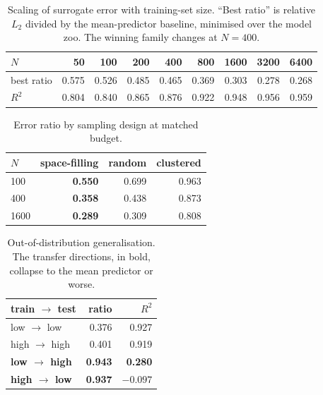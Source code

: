 \begin{table}[htbp]
\caption{Scaling of surrogate error with training-set size. ``Best ratio'' is
relative $L_2$ divided by the mean-predictor baseline, minimised over the model
zoo. The winning family changes at $N = 400$.}
\label{tab:scale}
\small
\begin{indented}\item[]
\begin{tabular}{@{}lrrrrrrrr@{}}
\toprule
$N$ & 50 & 100 & 200 & 400 & 800 & 1600 & 3200 & 6400 \\
\midrule
best ratio & 0.575 & 0.526 & 0.485 & 0.465 & 0.369 & 0.303 & 0.278 & 0.268 \\
$R^2$      & 0.804 & 0.840 & 0.865 & 0.876 & 0.922 & 0.948 & 0.956 & 0.959 \\
\bottomrule
\end{tabular}
\end{indented}
\end{table}

\begin{table}[htbp]
\caption{Error ratio by sampling design at matched budget.}
\label{tab:design}
\small
\begin{indented}\item[]
\begin{tabular}{@{}lrrr@{}}
\toprule
$N$ & space-filling & random & clustered \\
\midrule
100  & \textbf{0.550} & 0.699 & 0.963 \\
400  & \textbf{0.358} & 0.438 & 0.873 \\
1600 & \textbf{0.289} & 0.309 & 0.808 \\
\bottomrule
\end{tabular}
\end{indented}
\end{table}

\begin{table}[htbp]
\caption{Out-of-distribution generalisation. The transfer directions, in bold,
collapse to the mean predictor or worse.}
\label{tab:ood}
\small
\begin{indented}\item[]
\begin{tabular}{@{}lrr@{}}
\toprule
train $\rightarrow$ test & ratio & $R^2$ \\
\midrule
low $\rightarrow$ low   & 0.376 & 0.927 \\
high $\rightarrow$ high & 0.401 & 0.919 \\
\textbf{low $\rightarrow$ high}  & \textbf{0.943} & \textbf{0.280} \\
\textbf{high $\rightarrow$ low}  & \textbf{0.937} & \textbf{$-0.097$} \\
\bottomrule
\end{tabular}
\end{indented}
\end{table}

